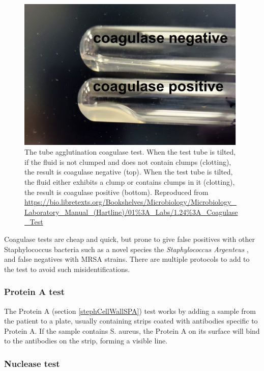     \begin{figure}[h]
        \centering
            \includegraphics[width=0.7\linewidth]{figures/Staph/coagulase positive negative tube.png} 
        \caption{The tube agglutination coagulase test. When the test tube is tilted, if the fluid is not clumped and does not contain clumps (clotting), the result is coagulase negative (top). When the test tube is tilted, the fluid either exhibits a clump or contains clumps in it (clotting), the result is coagulase positive (bottom). Reproduced from \url{ https://bio.libretexts.org/Bookshelves/Microbiology/Microbiology\_Laboratory\_Manual\_(Hartline)/01\%3A\_Labs/1.24\%3A\_Coagulase_Test}}
        \label{figure:coagualaseTube}
    \end{figure}


Coagulase tests are cheap and quick, but prone to give false positives with other Staphylococcus bacteria such as a novel species the \textit{Staphylococcus Argenteus} \cite{staphArgentusCH}, and false negatives with MRSA strains. There are multiple protocols to add to the test to avoid such misidentifications. \cite{LibreTextStaphID}


\subsubsection{Protein A test}
\label{staph:SPAtest}

The Protein A (section \ref{stephCellWallSPA}) test works by adding a sample from the patient to a plate, usually containing strips coated with antibodies specific to Protein A. If the sample contains S. aureus, the Protein A on its surface will bind to the antibodies on the strip, forming a visible line.

\subsubsection{Nuclease test}

